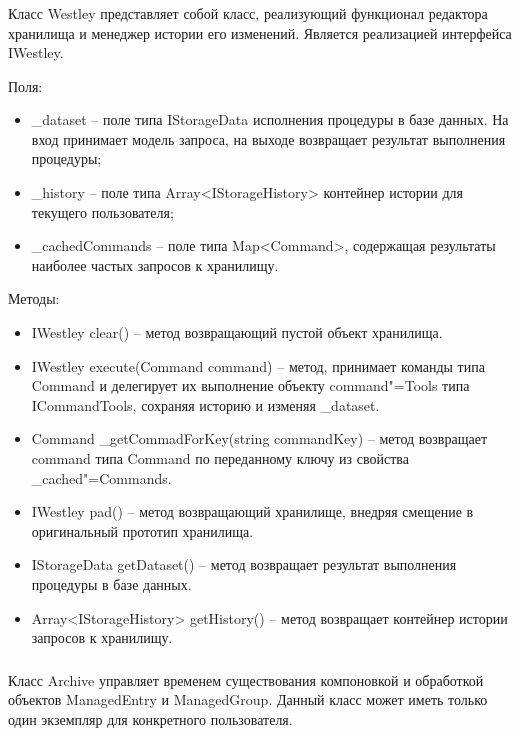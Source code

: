 \subsubsection{}
\label{sub:arch_and_mod:probab_net:westley}

Класс Westley представляет собой класс, реализующий функционал редактора хранилища и менеджер истории его изменений. Является реализацией интерфейса IWestley.

Поля:
\begin{itemize}
  \item \_dataset – поле типа IStorageData исполнения процедуры в базе данных. На вход принимает модель запроса, на выходе возвращает результат выполнения процедуры;
  \item \_history – поле типа Array<IStorageHistory> контейнер истории для текущего пользователя;
  \item \_cachedCommands – поле типа Map<Command>, содержащая результаты наиболее частых запросов к хранилищу.
\end{itemize}

Методы:
\begin{itemize}
  \item IWestley clear() – метод возвращающий пустой объект хранилища.
  \item IWestley execute(Command command) – метод, принимает команды типа Command и делегирует их выполнение объекту command"=Tools типа ICommandTools, сохраняя историю и изменяя \_dataset.
  \item Command \_getCommadForKey(string commandKey) – метод возвращает command типа Command по переданному ключу из свойства \_cached"=Commands.
  \item IWestley pad() – метод возвращающий хранилище, внедряя смещение в оригинальный прототип хранилища.
  \item IStorageData getDataset() – метод возвращает результат выполнения процедуры в базе данных.
  \item Array<IStorageHistory> getHistory() – метод возвращает контейнер истории запросов к хранилищу.
\end{itemize}

\subsubsection{}
\label{sub:arch_and_mod:probab_net:archive}

Класс Archive управляет временем существования компоновкой и обработкой объектов ManagedEntry и ManagedGroup. Данный класс может иметь только один экземпляр для конкретного пользователя.

